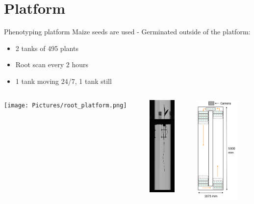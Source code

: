 \documentclass[]{beamer}
\begin{document}
\section{Platform}
\begin{frame}{Phenotyping platform}
Maize seeds are used - Germinated outside of the platform:
\begin{itemize}
    \item 2 tanks of 495 plants
    \item Root scan every 2 hours
    \item 1 tank moving 24/7, 1 tank still  
\end{itemize}
\begin{columns}
\begin{column}{0.5\textwidth}
\centering
\texttt{[image: Pictures/root\_platform.png]}
\end{column}
\begin{column}{0.15\textwidth} 
\centering
\includegraphics[height = 5cm]{Pictures/root_scan.jpg}
\end{column}
\begin{column}{0.25\textwidth}
\centering
\includegraphics[height = 5.4cm]{Pictures/platform_tank_topview.png}
\end{column}
\end{columns}

\end{frame}
\end{document}

